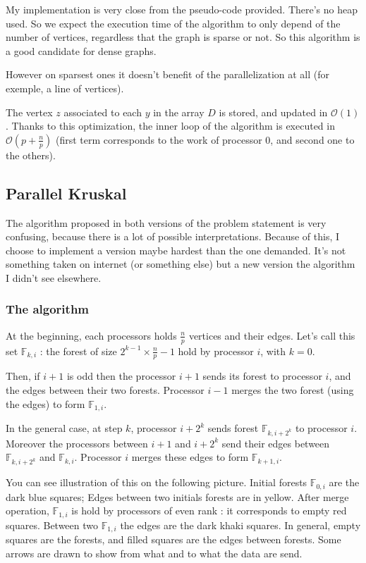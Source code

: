 \documentclass[a4paper, 10pt]{article}
\begin{document}
My implementation is very close from the pseudo-code provided. There's no heap used. So we expect the execution time of the algorithm to only depend of the number of vertices, regardless that the graph is sparse or not. So this algorithm is a good candidate for dense graphs.  
  
However on sparsest ones it doesn't benefit of the parallelization at all (for exemple, a line of vertices).  
  
The vertex $z$ associated to each $y$ in the array $D$ is stored, and updated in $\mathcal{O}(1)$. Thanks to this optimization, the inner loop of the algorithm is executed in $\mathcal{O}(p + \frac{n}{p})$ (first term corresponds to the work of processor $0$, and second one to the others).  
  
\newpage
\subsection{Parallel Kruskal}  
  
The algorithm proposed in both versions of the problem statement is very confusing, because there is a lot of possible interpretations. Because of this, I choose to implement a version maybe hardest than the one demanded. It's not something taken on internet (or something else) but a new version the algorithm I didn't see elsewhere.
  
\subsubsection{The algorithm}
  
At the beginning, each processors holds $\frac{n}{p}$ vertices and their edges. Let's call this set $\mathbb{F}_{k,i}$ : the forest of size $2^{k-1}\times\frac{n}{p}-1$ hold by processor $i$, with $k = 0$.  
  
Then, if $i+1$ is odd then the processor $i+1$ sends its forest to processor $i$, and the edges between their two forests.  
Processor $i-1$ merges the two forest (using the edges) to form $\mathbb{F}_{1,i}$.  
  
In the general case, at step $k$, processor $i+2^k$ sends forest $\mathbb{F}_{k,i+2^k}$ to processor $i$. Moreover the processors between $i+1$ and $i+2^k$ send their edges between $\mathbb{F}_{k,i+2^k}$ and $\mathbb{F}_{k,i}$. Processor $i$ merges these edges to form $\mathbb{F}_{k+1,i}$.  
  
You can see illustration of this on the following picture. Initial forests $\mathbb{F}_{0,i}$ are the dark blue squares; Edges between two initials forests are in yellow. After merge operation, $\mathbb{F}_{1,i}$ is hold by processors of even rank : it corresponds to empty red squares. Between two $\mathbb{F}_{1,i}$ the edges are the dark khaki squares. In general, empty squares are the forests, and filled squares are the edges between forests. Some arrows are drawn to show from what and to what the data are send.  
  
\end{document}
